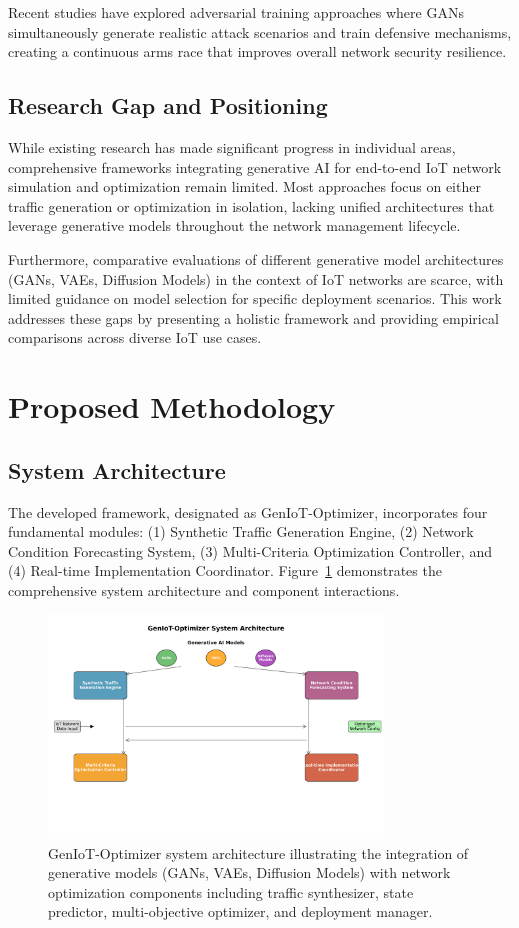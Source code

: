 \documentclass[conference]{IEEEtran}
\begin{document}
Recent studies have explored adversarial training approaches where GANs simultaneously generate realistic attack scenarios and train defensive mechanisms, creating a continuous arms race that improves overall network security resilience.

\subsection{Research Gap and Positioning}

While existing research has made significant progress in individual areas, comprehensive frameworks integrating generative AI for end-to-end IoT network simulation and optimization remain limited. Most approaches focus on either traffic generation or optimization in isolation, lacking unified architectures that leverage generative models throughout the network management lifecycle.

Furthermore, comparative evaluations of different generative model architectures (GANs, VAEs, Diffusion Models) in the context of IoT networks are scarce, with limited guidance on model selection for specific deployment scenarios. This work addresses these gaps by presenting a holistic framework and providing empirical comparisons across diverse IoT use cases.

\section{Proposed Methodology}

\subsection{System Architecture}

The developed framework, designated as GenIoT-Optimizer, incorporates four fundamental modules: (1) Synthetic Traffic Generation Engine, (2) Network Condition Forecasting System, (3) Multi-Criteria Optimization Controller, and (4) Real-time Implementation Coordinator. Figure~\ref{fig:architecture} demonstrates the comprehensive system architecture and component interactions.

\begin{figure}[!t]
\centering
\includegraphics[width=3.5in]{architecture_diagram.png}
\caption{GenIoT-Optimizer system architecture illustrating the integration of generative models (GANs, VAEs, Diffusion Models) with network optimization components including traffic synthesizer, state predictor, multi-objective optimizer, and deployment manager.}
\label{fig:architecture}
\end{figure}
\end{document}
